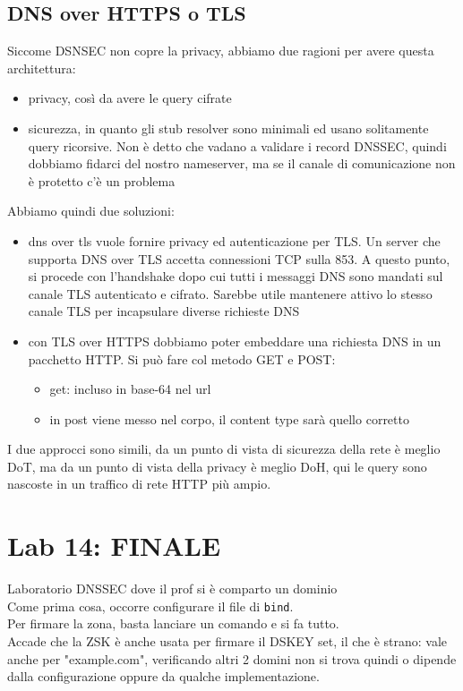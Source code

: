 \documentclass[12pt, oneside]{extbook} %
\begin{document}
\subsection{DNS over HTTPS o TLS}
Siccome DSNSEC non copre la privacy, abbiamo due ragioni per avere questa architettura:
\begin{itemize}
	\item privacy, così da avere le query cifrate
	\item sicurezza, in quanto gli stub resolver sono minimali ed usano solitamente query ricorsive. Non è detto che vadano a validare i record DNSSEC, quindi dobbiamo fidarci del nostro nameserver, ma se il canale di comunicazione non è protetto c'è un problema
\end{itemize}
Abbiamo quindi due soluzioni:
\begin{itemize}
	\item dns over tls vuole fornire privacy ed autenticazione per TLS. Un server che supporta DNS over TLS accetta connessioni TCP sulla 853. A questo punto, si procede con l'handshake dopo cui tutti i messaggi DNS sono mandati sul canale TLS autenticato e cifrato. Sarebbe utile mantenere attivo lo stesso canale TLS per incapsulare diverse richieste DNS
	\item con TLS over HTTPS dobbiamo poter embeddare una richiesta DNS in un pacchetto HTTP. Si può fare col metodo GET e POST:
	\begin{itemize}
		\item get: incluso in base-64 nel url
		\item in post viene messo nel corpo, il content type sarà quello corretto
	\end{itemize}
\end{itemize}
I due approcci sono simili, da un punto di vista di sicurezza della rete è meglio DoT, ma da un punto di vista della privacy è meglio DoH, qui le query sono nascoste in un traffico di rete HTTP più ampio.
\section{Lab 14: FINALE}
Laboratorio DNSSEC dove il prof si è comparto un dominio\\Come prima cosa, occorre configurare il file di \texttt{bind}.\\Per firmare la zona, basta lanciare un comando e si fa tutto.\\Accade che la ZSK è anche usata per firmare il DSKEY set, il che è strano: vale anche per "example.com", verificando altri 2 domini non si trova quindi o dipende dalla configurazione oppure da qualche implementazione.
\end{document}
